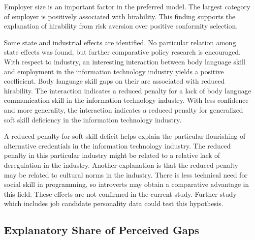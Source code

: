 \documentclass[review]{elsarticle}
\begin{document}
Employer size is an important factor in the preferred model.
The largest category of employer is positively associated with hirability.
This finding supports the explanation of hirability from risk aversion over positive conformity selection.

Some state and industrial effects are identified.
No particular relation among state effects was found, but further comparative policy research is encouraged.
With respect to industry, an interesting interaction between body language skill and employment in the information technology industry yields a positive coefficient.
Body language skill gaps on their are associated with reduced hirability.
The interaction indicates a reduced penalty for a lack of body language communication skill
in the information technology industry.
With less confidence and more generality, the interaction indicates a reduced penalty for generalized soft skill deficiency in the information technology industry.

A reduced penalty for soft skill deficit helps explain the particular flourishing of alternative credentials in the information technology industry.
The reduced penalty in this particular industry might be related to a relative lack of deregulation in the industry.
Another explanation is that the reduced penalty may be related to cultural norms in the industry.
There is less technical need for social skill in programming, so introverts may obtain a comparative advantage in this field.
These effects are not confirmed in the current study.
Further study which includes job candidate personality data could test this hypothesis.

\subsection{Explanatory Share of Perceived Gaps}
\end{document}
